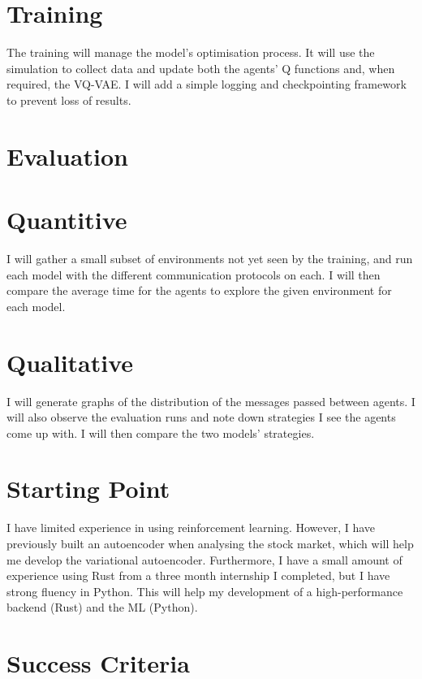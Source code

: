 \documentclass[20pt]{article}
\begin{document}
\section*{Training}
The training will manage the model's optimisation process. It will use the simulation to collect data and update both the agents' Q functions and, when required, the VQ-VAE. I will add a simple logging and checkpointing framework to prevent loss of results.

\section{Evaluation}

\section*{Quantitive}
I will gather a small subset of environments not yet seen by the training, and run each model with the different communication protocols on each. I will then compare the average time for the agents to explore the given environment for each model.

\section*{Qualitative}
I will generate graphs of the distribution of the messages passed between agents. I will also observe the evaluation runs and note down strategies I see the agents come up with. I will then compare the two models' strategies.


\section{Starting Point}
I have limited experience in using reinforcement learning. However, I have previously built an autoencoder when analysing the stock market, which will help me develop the variational autoencoder. Furthermore, I have a small amount of experience using Rust from a three month internship I completed, but I have strong fluency in Python. This will help my development of a high-performance backend (Rust) and the ML (Python).


\section{Success Criteria}
\end{document}
